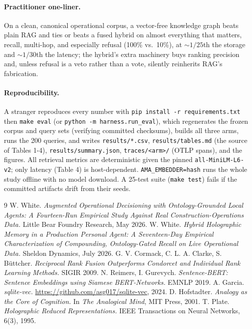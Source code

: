 \documentclass[11pt]{article}
\begin{document}
\paragraph{Practitioner one-liner.} On a clean, canonical operational corpus, a vector-free
knowledge graph beats plain RAG and ties or beats a fused hybrid on almost everything that
matters, recall, multi-hop, and especially refusal (100\% vs.\ 10\%), at ${\sim}1/25$th the
storage and ${\sim}1/30$th the latency; the hybrid's extra machinery buys ranking precision
and, unless refusal is a veto rather than a vote, silently reinherits RAG's fabrication.

\paragraph{Reproducibility.} A stranger reproduces every number with
\texttt{pip install -r requirements.txt} then \texttt{make eval} (or
\texttt{python -m harness.run\_eval}), which regenerates the frozen corpus and query sets
(verifying committed checksums), builds all three arms, runs the 200 queries, and writes
\texttt{results/*.csv}, \texttt{results/tables.md} (the source of Tables 1-4),
\texttt{results/summary.json}, \texttt{traces/<arm>/} (OTLP spans), and the figures. All
retrieval metrics are deterministic given the pinned \texttt{all-MiniLM-L6-v2}; only latency
(Table 4) is host-dependent. \texttt{AMA\_EMBEDDER=hash} runs the whole study offline with no
model download. A 25-test suite (\texttt{make test}) fails if the committed artifacts drift
from their seeds.

\begin{thebibliography}{9}
\small
{} W. White. \emph{Augmented Operational Decisioning with Ontology-Grounded Local
Agents: A Fourteen-Run Empirical Study Against Real Construction-Operations Data.} Little Bear Foundry Research, May 2026.
 W. White. \emph{Hybrid Holographic Memory in a Production Personal Agent: A
Seventeen-Day Empirical Characterization of Compounding, Ontology-Gated Recall on Live
Operational Data.} Sheldon Dynamics, July 2026.
 G. V. Cormack, C. L. A. Clarke, S. B\"uttcher. \emph{Reciprocal Rank Fusion
Outperforms Condorcet and Individual Rank Learning Methods.} SIGIR 2009.
 N. Reimers, I. Gurevych. \emph{Sentence-BERT: Sentence Embeddings using
Siamese BERT-Networks.} EMNLP 2019.
 A. Garcia. \emph{sqlite-vec.} \url{https://github.com/asg017/sqlite-vec}, 2024.
 D. Hofstadter. \emph{Analogy as the Core of Cognition.} In \emph{The
Analogical Mind}, MIT Press, 2001.
 T. Plate. \emph{Holographic Reduced Representations.} IEEE Transactions on
Neural Networks, 6(3), 1995.
\end{thebibliography}
\end{document}

